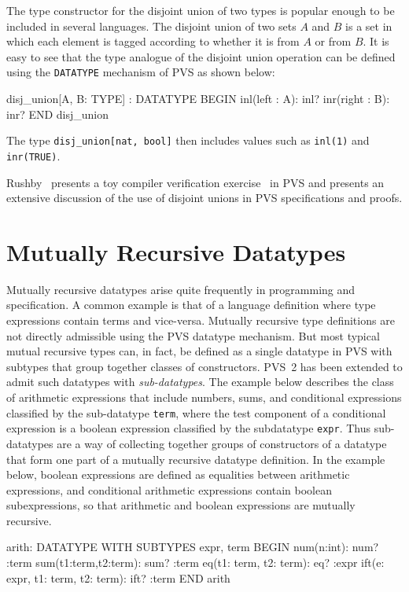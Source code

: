 \documentclass[11pt,twoside]{book}
\begin{document}
The type constructor for the disjoint union of two types is popular
enough to be included in several languages.  The disjoint union of two
sets $A$ and $B$ is a set  in which each element is tagged according
to whether it is from $A$ or from $B$\@. 
  It is easy to see that the type analogue of the
disjoint union operation can be defined using the \texttt{DATATYPE}
mechanism of PVS as shown below:
\begin{session*}
disj_union[A, B: TYPE] : DATATYPE
  BEGIN
    inl(left : A): inl?
    inr(right : B): inr?
  END disj_union
\end{session*}
The type \texttt{disj\_union[nat, bool]}  then includes
values such as \texttt{inl(1)} and \texttt{inr(TRUE)}\@.  

Rushby~\cite{Rushby95:movie} presents a toy compiler verification
exercise~\cite{Weber-Wulff93} in PVS and presents an extensive
discussion of the use of disjoint unions in PVS specifications and
proofs.

\chapter{Mutually Recursive Datatypes}\label{mutual}

Mutually recursive datatypes arise quite frequently in
programming and specification.  A common example is that of
a language definition where type expressions contain terms and vice-versa.  
Mutually recursive type definitions are not directly admissible using
the PVS datatype mechanism.  But most typical mutual recursive types can,
in fact, be  
defined as a single datatype in PVS with subtypes that
group together classes of constructors.  PVS~2 has been
extended to admit such datatypes with \emph{sub-datatypes}\@.
The example below describes the class of arithmetic expressions that
include numbers, sums, and conditional expressions classified
by the sub-datatype \texttt{term}, where the test
component of a conditional expression is a boolean expression
classified by the subdatatype \texttt{expr}.   Thus sub-datatypes
are a way of collecting together groups of constructors of a datatype
that form one part of a mutually recursive datatype definition.  
In the example below,  boolean expressions are defined as equalities
between arithmetic expressions, and conditional arithmetic expressions
contain boolean subexpressions, so that 
arithmetic and boolean expressions are mutually recursive.  
\begin{session*}
arith: DATATYPE WITH SUBTYPES expr, term
 BEGIN
  num(n:int): num?              :term
  sum(t1:term,t2:term):   sum?  :term
  eq(t1: term, t2: term): eq?   :expr
  ift(e: expr, t1: term, t2: term): ift? :term
 END arith
\end{session*}
\end{document}
